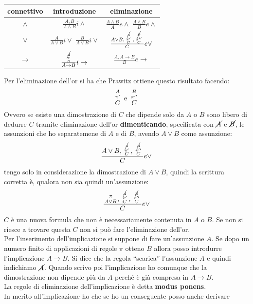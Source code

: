 \documentclass[a4paper,12pt, oneside]{book}
\newcommand*{\bfrac}[2]{\genfrac{}{}{0pt}{}{#1}{#2}}
\begin{document}
\begin{table}[H]
  \Large
  \centering
  \begin{tabular}{c||c|c}
    connettivo& introduzione & eliminazione\\
    \hline
    \hline
    $\land$ & $\frac{A,B}{A\land B}i\land$&$\frac{A\land B}{A}e\land$
                                            $\frac{A\land B}{B}e\land$\\
    \hline
    $\lor$ &$\frac{A}{A\lor B}i\lor$
             $\frac{B}{A\lor B}i\lor$&$\frac{A\lor B,
                                       \bfrac{\bfrac{\cancel{A}}{\pi'}}{C},
                                       \bfrac{\bfrac{\cancel{B}}{\pi''}}{C}}{C}
                                       e\lor$\\
    \hline
    $\to$ & $\frac{\bfrac{\cancel{A}}
            {\bfrac{\pi}{B}}}{A\to B}i\to$ & $\frac{A,A\to B}{B}e\to$\\
    \hline
  \end{tabular}
\end{table}
Per l'eliminazione dell'or si ha che Prawitz ottiene questo risultato facendo:
\[\bfrac{\bfrac{A}{\pi'}}{C}\mbox{ e }\bfrac{\bfrac{B}{\pi''}}{C}\]
Ovvero se esiste una dimostrazione di $C$ che dipende solo da $A$ o $B$ sono
libero di dedurre $C$ tramite eliminazione dell'or \textbf{dimenticando},
specificata con $\cancel{A}$ e $\cancel{B}$, le
assunzioni che ho separatemene di $A$ e di $B$, avendo $A\lor B$ come
assunzione: 
\[\frac{A\lor B,\bfrac{\bfrac{\cancel{A}}{\pi'}}{C},
    \bfrac{\bfrac{\cancel{B}}{\pi''}}{C}}{C}e\lor\]
tengo solo in considerazione la dimostrazione di $A\lor B$, quindi la scrittura
corretta è, qualora non sia quindi un'assunzione:
\[\frac{\bfrac{\pi}{A\lor B},\bfrac{\bfrac{\cancel{A}}{\pi'}}{C},
    \bfrac{\bfrac{\cancel{B}}{\pi''}}{C}}{C}e\lor\]
$C$ è una nuova formula che non è necessariamente contenuta in $A$ o $B$. Se non
si riesce a trovare questa $C$ non si può fare l'eliminazione dell'or.\\
Per l'inserimento dell'implicazione si suppone di fare un'assunzione $A$. Se
dopo un numero finito di applicazioni di regole $\pi$ otteno $B$ allora posso
introdurre l'implicazione $A\to B$. Si dice che la regola ``scarica''
l'assunzione $A$ e quindi indichiamo $\cancel{A}$. Quando scrivo poi
l'implicazione ho comunque che la dimostrazione non dipende più da $A$ perché è
già compresa in $A\to B$.\\
La regole di eliminazione dell'implicazione è detta \textbf{modus ponens}.\\
In merito all'implicazione ho che se ho un conseguente posso anche derivare
\end{document}

